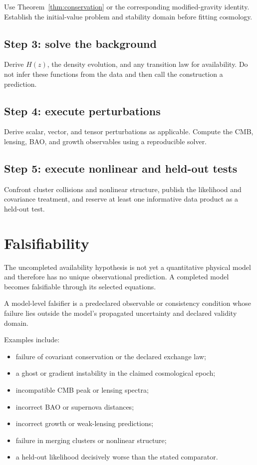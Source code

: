 \documentclass[11pt]{article}
\begin{document}
Use Theorem~\ref{thm:conservation} or the corresponding modified-gravity
identity.  Establish the initial-value problem and stability domain before
fitting cosmology.

\subsection{Step 3: solve the background}

Derive $H(z)$, the density evolution, and any transition law for availability.
Do not infer these functions from the data and then call the construction a
prediction.

\subsection{Step 4: execute perturbations}

Derive scalar, vector, and tensor perturbations as applicable.  Compute the
CMB, lensing, BAO, and growth observables using a reproducible solver.

\subsection{Step 5: execute nonlinear and held-out tests}

Confront cluster collisions and nonlinear structure, publish the likelihood
and covariance treatment, and reserve at least one informative data product
as a held-out test.

\section{Falsifiability}

The uncompleted availability hypothesis is not yet a quantitative physical
model and therefore has no unique observational prediction.  A completed
model becomes falsifiable through its selected equations.

\begin{definition}
A model-level falsifier is a predeclared observable or consistency condition
whose failure lies outside the model's propagated uncertainty and declared
validity domain.
\end{definition}

Examples include:
\begin{itemize}
\item failure of covariant conservation or the declared exchange law;
\item a ghost or gradient instability in the claimed cosmological epoch;
\item incompatible CMB peak or lensing spectra;
\item incorrect BAO or supernova distances;
\item incorrect growth or weak-lensing predictions;
\item failure in merging clusters or nonlinear structure;
\item a held-out likelihood decisively worse than the stated comparator.
\end{itemize}
\end{document}
